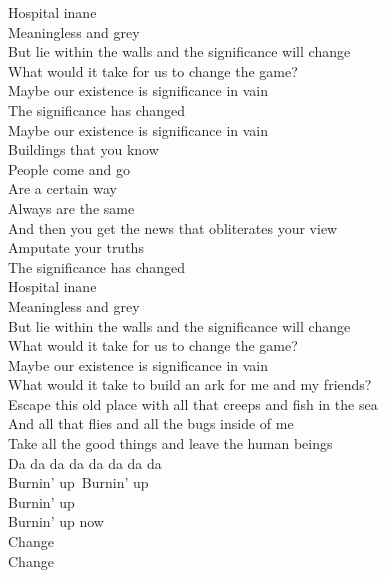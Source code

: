 Hospital inane \\
Meaningless and grey \\
But lie within the walls and the significance will change \\
What would it take for us to change the game? \\
Maybe our existence is significance in vain \\
The significance has changed \\
Maybe our existence is significance in vain \\

Buildings that you know \\
People come and go \\
Are a certain way \\
Always are the same \\
And then you get the news that obliterates your view \\
Amputate your truths \\
The significance has changed \\

Hospital inane \\
Meaningless and grey \\
But lie within the walls and the significance will change \\
What would it take for us to change the game? \\
Maybe our existence is significance in vain \\

What would it take to build an ark for me and my friends? \\
Escape this old place with all that creeps and fish in the sea \\
And all that flies and all the bugs inside of me \\
Take all the good things and leave the human beings \\

Da da da da da da da da \\

Burnin' up\
Burnin' up \\
Burnin' up \\
Burnin' up now \\

Change \\
Change \\



